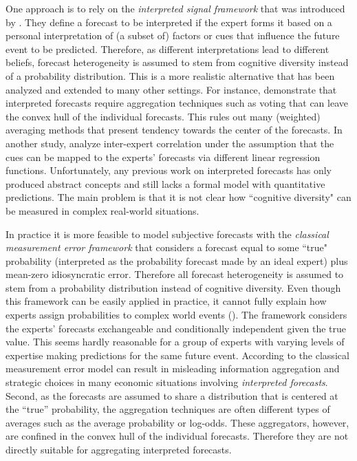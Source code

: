 \documentclass[11pt]{article}
\theoremstyle{definition}
\theoremstyle{definition}
\begin{document}
One approach is to rely on the \textit{interpreted signal framework} that was introduced by \cite{hong2009interpreted}. They define a forecast to be interpreted if the expert forms it based on a personal interpretation of (a subset of) factors or cues that influence the future event to be predicted. Therefore, as different interpretations lead to different beliefs, forecast heterogeneity is assumed to stem from cognitive diversity instead of a probability distribution. This is a more realistic alternative that has been analyzed and extended to many other settings. For instance, \cite{parunak2013characterizing} demonstrate that interpreted forecasts require aggregation techniques such as voting that can leave the convex hull of the individual forecasts. This rules out many (weighted) averaging methods that present tendency towards the center of the forecasts. In another study, \cite{broomell2009experts} analyze inter-expert correlation under the assumption that the cues can be mapped to the experts' forecasts via different linear regression functions. Unfortunately, any previous work on interpreted forecasts has only produced abstract concepts and still lacks a formal model with quantitative predictions. The main problem is that it is not clear how ``cognitive diversity" can be measured in complex real-world situations.
 
 In practice it is more feasible to model subjective forecasts with the \textit{classical measurement error framework} that  considers a forecast equal to some ``true" probability (interpreted as the probability forecast made by an ideal expert) plus mean-zero idiosyncratic error. Therefore all forecast heterogeneity is assumed to stem from a probability distribution instead of cognitive diversity. Even though this framework can be easily applied in practice, it cannot fully explain how experts assign probabilities to complex world events (\cite{parunak2013exploiting}). The framework considers the experts' forecasts exchangeable and conditionally independent given the true value. This seems hardly reasonable for a group of experts with varying levels of expertise making predictions for the same future event. According to \cite{hong2009interpreted} the classical measurement error model can result in misleading information aggregation and strategic choices in many economic situations involving \textit{interpreted forecasts}. Second, as the forecasts are assumed to share a distribution that is centered at the ``true'' probability, the aggregation techniques are often different types of averages such as the average probability or log-odds. These aggregators, however, are confined in the convex hull of the individual forecasts. Therefore they are not directly suitable for aggregating interpreted forecasts. 
\end{document}
